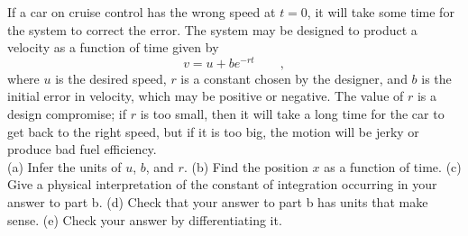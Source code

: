 If a car on cruise control has the wrong speed at $t=0$, it will take some time
for the system to correct the error. The system may be designed to
product a velocity as a function of time given by
\begin{equation*}
  v = u+be^{-rt} \qquad ,
\end{equation*}
where $u$ is the desired speed, $r$ is a constant chosen by the designer,
and $b$ is the initial error in velocity, which may be positive or
negative. The value of $r$ is a design compromise; if $r$ is too small, then
it will take a long time for the car to get back to the right speed, but if
it is too big, the motion will be jerky or produce bad fuel efficiency.\\
(a) Infer the units of $u$, $b$, and $r$.\hwendpart
(b) Find the position $x$ as a function of time.\answercheck\hwendpart
(c) Give a physical interpretation of the constant of integration occurring in
your answer to part b.\hwendpart
(d) Check that your answer to part b has units that make sense.\hwendpart
(e) Check your answer by differentiating it.
